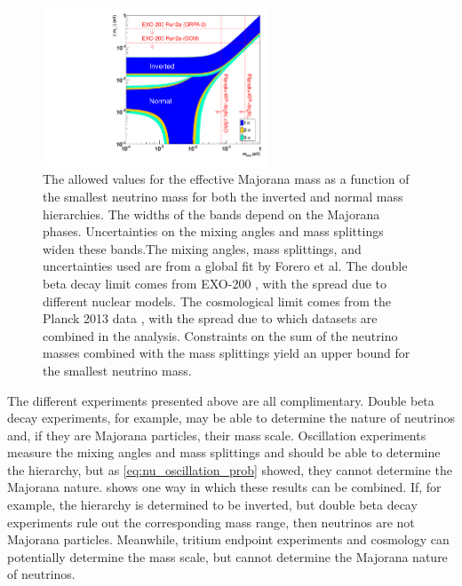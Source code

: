 \documentclass[herrin-thesis.tex]{subfiles}
\begin{document}
\begin{figure}[htp]
	\centering
	\includegraphics[width=0.6\textwidth]{./plots/nu_meff_v_mmin.pdf}
	\caption[Effective Majorana mass vs. smallest neutrino mass]{The allowed values for the effective Majorana mass as a function of the smallest neutrino mass for both the inverted and normal mass hierarchies. The widths of the bands depend on the Majorana phases. Uncertainties on the mixing angles and mass splittings widen these bands.The mixing angles, mass splittings, and uncertainties used are from a global fit by Forero et al. \cite{Forero:2012cr} The double beta decay limit comes from EXO-200 \cite{Auger:2012ar}, with the spread due to different nuclear models. The cosmological limit comes from the Planck 2013 data \cite{Ade:2013kl}, with the spread due to which datasets are combined in the analysis. Constraints on the sum of the neutrino masses combined with the mass splittings yield an upper bound for the smallest neutrino mass.}
	\label{fig:nu_meff_v_mmin}
\end{figure}

The different experiments presented above are all complimentary. Double beta decay experiments, for example, may be able to determine the nature of neutrinos and, if they are Majorana particles, their mass scale. Oscillation experiments measure the mixing angles and mass splittings and should be able to determine the hierarchy, but as \cref{eq:nu_oscillation_prob} showed, they cannot determine the Majorana nature.  shows one way in which these results can be combined. If, for example, the hierarchy is determined to be inverted, but double beta decay experiments rule out the corresponding mass range, then neutrinos are not Majorana particles. Meanwhile, tritium endpoint experiments and cosmology can potentially determine the mass scale, but cannot determine the Majorana nature of neutrinos.
\end{document}
